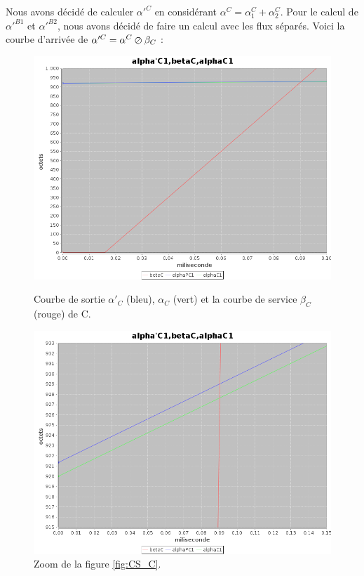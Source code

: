  Nous avons décidé de calculer $\alpha'^C$ en considérant $\alpha^C = \alpha_1^C + \alpha_2^C$. Pour le calcul de $\alpha'^{B1}$ et $\alpha'^{B2}$, nous avons décidé de faire un calcul avec les flux séparés.
Voici la courbe d'arrivée de $\alpha'^C = \alpha^C \varoslash \beta_C$ : 
\begin{figure}[!ht]%
\begin{minipage}{.48\textwidth}%
\centering%
\noindent\includegraphics[width = \textwidth]{./II/images/alphaP_C1.png}%
\caption{\label{fig:CS_C}Courbe de sortie $\alpha'_C$ (bleu), $\alpha_C$ (vert) et la courbe de service $\beta_C$ (rouge) de C.}%
\end{minipage}\hfill%
\begin{minipage}{.48\textwidth}%
\centering%
\noindent\includegraphics[width = \textwidth]{./II/images/alphaP_C1-2.png}%
\caption{\label{fig:CS_C-2}Zoom de la figure \ref{fig:CS_C}.}%
\end{minipage}%
\end{figure} 


